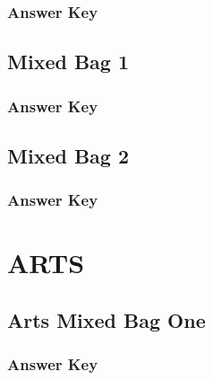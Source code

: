 \documentclass[12pt,a4paper]{book}
\newcounter{totalcounter}
\begin{document}


\subsection*{Answer Key}



\setcounter{totalcounter}{1}

\section{Mixed Bag 1}



\subsection*{Answer Key}



\setcounter{totalcounter}{1}

\section{Mixed Bag 2}



\subsection*{Answer Key}



\chapter{ARTS}

\setcounter{totalcounter}{1}

\section{Arts Mixed Bag One}



\subsection*{Answer Key}
\end{document}
